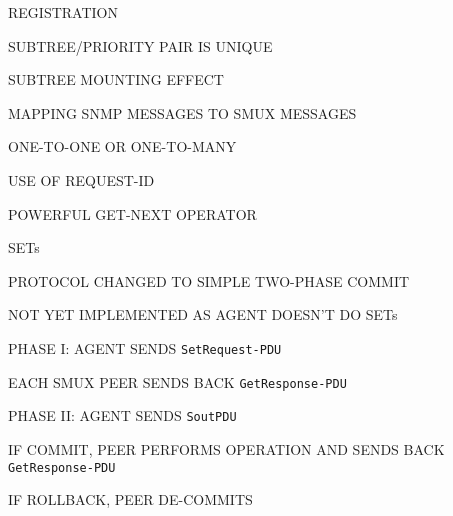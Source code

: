 \begin{bwslide}

\begin{nrtc}
\item	REGISTRATION
    \begin{nrtc}
    \item	SUBTREE/PRIORITY PAIR IS UNIQUE

    \item	SUBTREE MOUNTING EFFECT
    \end{nrtc}
\end{nrtc}
\end{bwslide}




\begin{bwslide}

\begin{nrtc}
\item	MAPPING SNMP MESSAGES TO SMUX MESSAGES
    \begin{nrtc}
    \item	ONE-TO-ONE OR ONE-TO-MANY

    \item	USE OF REQUEST-ID
    \end{nrtc}

\item	POWERFUL GET-NEXT OPERATOR

\item	SETs
\end{nrtc}
\end{bwslide}


\begin{bwslide}

\begin{nrtc}
\item	PROTOCOL CHANGED TO SIMPLE TWO-PHASE COMMIT
    \begin{nrtc}
    \item	NOT YET IMPLEMENTED AS AGENT DOESN'T DO SETs
    \end{nrtc}

\item	PHASE I: AGENT SENDS \verb"SetRequest-PDU"
    \begin{nrtc}
    \item	EACH SMUX PEER SENDS BACK \verb"GetResponse-PDU"
    \end{nrtc}

\item	PHASE II: AGENT SENDS \verb"SoutPDU"
    \begin{nrtc}
    \item	IF COMMIT, PEER PERFORMS OPERATION AND SENDS BACK
		\verb"GetResponse-PDU" 

    \item	IF ROLLBACK, PEER DE-COMMITS
    \end{nrtc}
\end{nrtc}
\end{bwslide}


